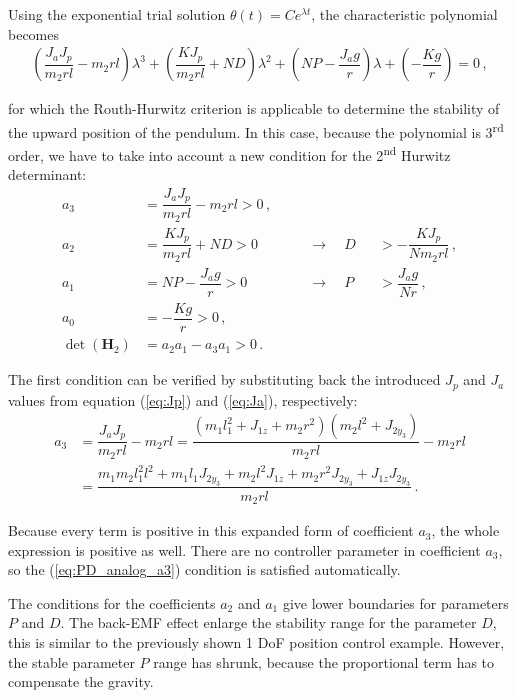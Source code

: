 \noindent
Using the exponential trial solution $\theta(t) = Ce^{\lambda t} $, the characteristic polynomial becomes
\begin{align}
		\left(\dfrac{J_a J_p}{m_2 r l}- m_2 r l\right) \lambda^3
		+
		\left(\dfrac{KJ_p}{m_2 r l} + ND\right) \lambda^2
		+
		\left(NP - \dfrac{J_a g}{r}\right) \lambda
		+
		\left(-\dfrac{Kg}{r}\right) = 0\,, \label{eq:PD_charpoly}
\end{align}

\noindent 
for which the Routh-Hurwitz criterion is applicable to determine the stability of the upward position of the pendulum. In this case, because the polynomial is 3\textsuperscript{rd} order, we have to take into account a new condition for the 2\textsuperscript{nd} Hurwitz determinant:
\begin{subequations}
	\begin{alignat}{3}
		a_3&=\dfrac{J_a J_p}{m_2 r l}- m_2 r l>0\,, 			\label{eq:PD_analog_a3}	\\
		a_2&=\dfrac{KJ_p}{m_2 r l} + ND>0 &&\quad\rightarrow\quad D&&>-\dfrac{K J_p}{N m_2 r l}\,, \\
		a_1&=NP - \dfrac{J_a g}{r}>0 &&\quad\rightarrow\quad P&&>\dfrac{J_a g}{N r} \,, \\
		a_0&=-\dfrac{Kg}{r}>0\,, \\
		\det(\mathbf H_2) &= a_2a_1-a_3a_1 > 0\,.
	\end{alignat}
\end{subequations}


\noindent
The first condition can be verified by substituting back the introduced $J_p$ and $J_a$ values from equation (\ref{eq:Jp}) and (\ref{eq:Ja}), respectively: 
\begin{align}
	a_3&=\dfrac{J_a J_p}{m_2 r l}- m_2 r l = \dfrac{(m_1 l_1^2 + J_{1z}  + m_2 r^2) (m_2 l^2 + J_{2y_3}) }{m_2 r l} -m_2 r l  \nonumber\\
	&= 	\dfrac{ m_1 m_2 l_1^2l^2 
			+ m_1 l_1 J_{2y_3} 
			+m_2 l^2 J_{1z}
			+m_2 r^2 J_{2y_3}
			+J_{1z} J_{2y_3} 
			}{m_2 r l}\,. \label{eq:a_3_is_positive}
\end{align}

\noindent
Because every term is positive in this expanded form of coefficient $a_3$, the whole expression is positive as well. There are no controller parameter in coefficient $a_3$, so the (\ref{eq:PD_analog_a3}) condition is satisfied automatically. 

The conditions for the coefficients $a_2$ and $a_1$ give lower boundaries for  parameters $P$ and $D$. The back-EMF  effect enlarge the stability range for the  parameter $D$, this is similar to the previously shown 1 DoF position control example. However, the stable  parameter $P$ range has shrunk, because the proportional term has to compensate the gravity.

